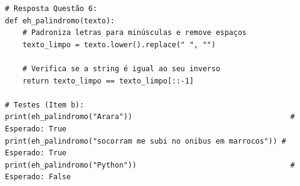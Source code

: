 \ifmostrarGabarito
\begin{verbatim}
# Resposta Questão 6:
def eh_palindromo(texto):
    # Padroniza letras para minúsculas e remove espaços
    texto_limpo = texto.lower().replace(" ", "")
    
    # Verifica se a string é igual ao seu inverso
    return texto_limpo == texto_limpo[::-1]

# Testes (Item b):
print(eh_palindromo("Arara"))                                    # Esperado: True
print(eh_palindromo("socorram me subi no onibus em marrocos")) # Esperado: True
print(eh_palindromo("Python"))                                   # Esperado: False
\end{verbatim}
\fi
